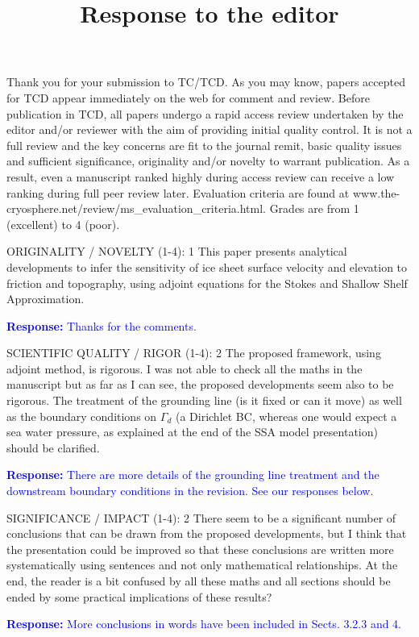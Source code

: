 \documentclass{article}
\newcommand{\colorthree}{blue}
\newcommand{\revth}[1]{\noindent \textcolor{\colorthree}{{\bf Response:} #1}}
\begin{document}
\title{Response to the editor}
\maketitle

{
Thank you for your submission to TC/TCD. 
As you may know, papers accepted for TCD appear immediately on the web for comment and review. Before publication in TCD, all papers undergo a rapid access review undertaken by the editor and/or reviewer with the aim of providing initial quality control. It is not a full review and the key concerns are fit to the journal remit, basic quality issues and sufficient significance, originality and/or novelty to warrant publication. As a result, even a manuscript ranked highly during access review can receive a low ranking during full peer review later. Evaluation criteria are found at www.the-cryosphere.net/review/ms\_evaluation\_criteria.html. Grades are from 1 (excellent) to 4 (poor). 

{ ORIGINALITY / NOVELTY (1-4): 1}
This paper presents analytical developments to infer the sensitivity of ice sheet surface velocity and elevation to friction and topography, using adjoint equations for the Stokes and Shallow Shelf Approximation. 

\revth{Thanks for the comments.}

{ SCIENTIFIC QUALITY / RIGOR (1-4): 2}
The proposed framework, using adjoint method, is rigorous. I was not able to check all the maths in the manuscript but as far as I can see, the proposed developments seem also to be rigorous. The treatment of the grounding line (is it fixed or can it move) as well as the boundary conditions on $\Gamma_d$ (a Dirichlet BC, whereas one would expect a sea water pressure, as explained at the end of the SSA model presentation) should be clarified. 

\revth{There are more details of the grounding line treatment and the downstream boundary conditions in the revision. See our responses below.}

{ SIGNIFICANCE / IMPACT (1-4): 2}
There seem to be a significant number of conclusions that can be drawn from the proposed developments, but I think that the presentation could be improved so that these conclusions are written more systematically using sentences and not only mathematical relationships. At the end, the reader is a bit confused by all these maths and all sections should be ended by some practical implications of these results?

\revth{More conclusions in words have been included in Sects. 3.2.3 and 4. }

}
\end{document}
